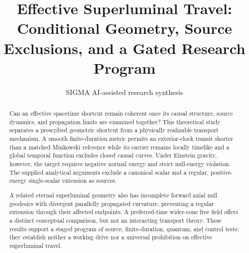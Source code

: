 \documentclass[11pt]{article}
\title{Effective Superluminal Travel: Conditional Geometry, Source Exclusions, and a Gated Research Program}
\date{}
\author{SIGMA AI-assisted research synthesis}
\begin{document}
\maketitle

\begin{abstract}
Can an effective spacetime shortcut remain coherent once its causal structure, source dynamics, and propagation limits are examined together? This theoretical study separates a prescribed geometric shortcut from a physically realizable transport mechanism. A smooth finite-duration metric permits an exterior-clock transit shorter than a matched Minkowski reference while its carrier remains locally timelike and a global temporal function excludes closed causal curves. Under Einstein gravity, however, the target requires negative normal energy and strict null-energy violation. The supplied analytical arguments exclude a canonical scalar and a regular, positive-energy single-scalar extension as sources.

A related eternal superluminal geometry also has incomplete forward axial null geodesics with divergent parallelly propagated curvature, preventing a regular extension through their affected endpoints. A preferred-time wider-cone free field offers a distinct conceptual comparison, but not an interacting transport theory. These results support a staged program of source, finite-duration, quantum, and control tests; they establish neither a working drive nor a universal prohibition on effective superluminal travel.
\end{abstract}
\begingroup\setlength{\fboxsep}{10pt}
\noindent{}\endgroup\par\medskip
\end{document}
